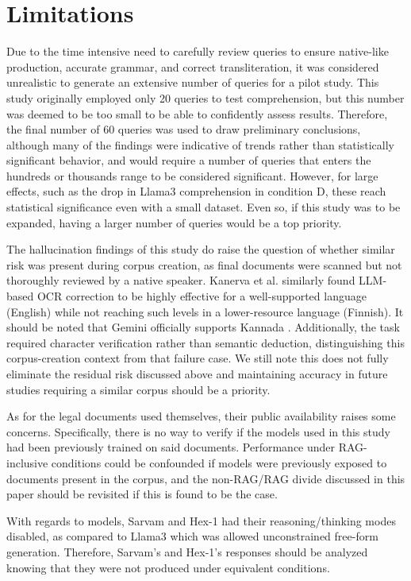\documentclass[11pt]{article}
\begin{document}
\section*{Limitations}

Due to the time intensive need to carefully review queries to ensure native-like production, accurate grammar, and correct transliteration, it was considered unrealistic to generate an extensive number of queries for a pilot study. This study originally employed only 20 queries to test comprehension, but this number was deemed to be too small to be able to confidently assess results.  Therefore, the final number of 60 queries was used to draw preliminary conclusions, although many of the findings were indicative of trends rather than statistically significant behavior, and would require a number of queries that enters the hundreds or thousands range to be considered significant. However, for large effects, such as the drop in Llama3 comprehension in condition D, these reach statistical significance even with a small dataset. Even so, if this study was to be expanded, having a larger number of queries would be a top priority. 

The hallucination findings of this study do raise the question of whether similar risk was present during corpus creation, as final documents were scanned but not thoroughly reviewed by a native speaker.  Kanerva et al. \citep{kanerva2025ocr} similarly found LLM-based OCR correction to be highly effective for a well-supported language (English) while not reaching such levels in a lower-resource language (Finnish). It should be noted that Gemini officially supports Kannada \citep{google2024geminiindia}. Additionally, the task required character verification rather than semantic deduction, distinguishing this corpus-creation context from that failure case. We still note this does not fully eliminate the residual risk discussed above and maintaining accuracy in future studies requiring a similar corpus should be a priority. 

As for the legal documents used themselves, their public availability raises some concerns. Specifically, there is no way to verify if the models used in this study had been previously trained on said documents. Performance under RAG-inclusive conditions could be confounded if models were previously exposed to documents present in the corpus, and the non-RAG/RAG divide discussed in this paper should be revisited if this is found to be the case. 

With regards to models, Sarvam and Hex-1 had their reasoning/thinking modes disabled, as compared to Llama3 which was allowed unconstrained free-form generation. Therefore, Sarvam's and Hex-1's responses should be analyzed knowing that they were not produced under equivalent conditions. 
\end{document}
